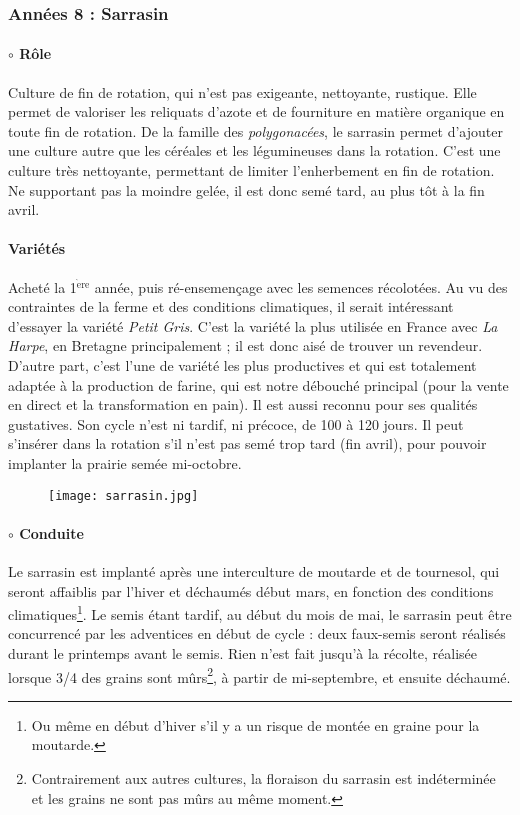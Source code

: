 \documentclass{book}
\begin{document}
\subsubsection{Années 8 : Sarrasin}

\paragraph{$\circ$ Rôle} Culture de fin de rotation, qui n'est pas exigeante, nettoyante, rustique. Elle permet de valoriser les reliquats d'azote et de fourniture en matière organique en toute fin de rotation. De la famille des \textit{polygonacées}, le sarrasin permet d'ajouter une culture autre que les céréales et les légumineuses dans la rotation. C'est une culture très nettoyante, permettant de limiter l'enherbement en fin de rotation. Ne supportant pas la moindre gelée, il est donc semé tard, au plus tôt à la fin avril.

\paragraph{Variétés} Acheté la 1$^{\mathrm{\grave{e}re}}$ année, puis ré-ensemençage avec les semences récolotées. Au vu des contraintes de la ferme et des conditions climatiques, il serait intéressant d'essayer la variété \textit{Petit Gris}. C'est la variété la plus utilisée en France avec \textit{La Harpe}, en Bretagne principalement ; il est donc aisé de trouver un revendeur. D'autre part, c'est l'une de variété les plus productives et qui est totalement adaptée à la production de farine, qui est notre débouché principal (pour la vente en direct et la transformation en pain). Il est aussi reconnu pour ses qualités gustatives. Son cycle n'est ni tardif, ni précoce, de 100 à 120 jours. Il peut s'insérer dans la rotation s'il n'est pas semé trop tard (fin avril), pour pouvoir implanter la prairie semée mi-octobre.

\begin{figure}[h!]
\begin{center}
	\texttt{[image: sarrasin.jpg]}
\end{center}
\end{figure}

\paragraph{$\circ$ Conduite} Le sarrasin est implanté après une interculture de moutarde et de tournesol, qui seront affaiblis par l'hiver et déchaumés début mars, en fonction des conditions climatiques\footnote{Ou même en début d'hiver s'il y a un risque de montée en graine pour la moutarde.}. Le semis étant tardif, au début du mois de mai, le sarrasin peut être concurrencé par les adventices en début de cycle : deux faux-semis seront réalisés durant le printemps avant le semis. Rien n'est fait jusqu'à la récolte, réalisée lorsque 3/4 des grains sont mûrs\footnote{Contrairement aux autres cultures, la floraison du sarrasin est indéterminée et les grains ne sont pas mûrs au même moment.}, à partir de mi-septembre, et ensuite déchaumé.
\end{document}
